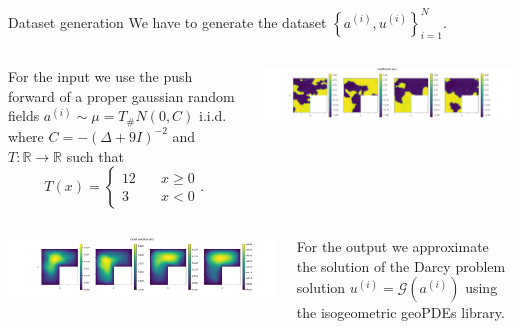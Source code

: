 \documentclass{beamer}
\newcommand{\numberset}{\mathbb}
\newcommand{\R}{\numberset{R}}
\begin{document}

\begin{frame}{Dataset generation}
	\vspace{-0.5cm}
	We have to generate the dataset $ \left\lbrace a^{(i)}, u^{(i)} \right \rbrace_{i=1}^{N} $.
	\\ \vspace{0.5cm}
	\pause
	\begin{columns}
		\begin{column}{0.7\textwidth}
			For the input we use the push forward of a proper gaussian random fields $ a^{(i)} \sim\mu = T_{\#}N(0, C) $ i.i.d. where $C = -(\Delta + 9I)^{-2}$ and $T:\R \to \R$ such that 
			\[ T(x) = \begin{cases}
				12\quad & x \ge 0\\
				3 \quad & x < 0 
			\end{cases}. \]
		\end{column}%
		\begin{column}{0.3\textwidth}
            \includegraphics[width=\textwidth]{FNO_continuation_input.png}
		\end{column}
	\end{columns}

	\vspace{0.5cm}
	\pause
	\begin{columns}
		\begin{column}{0.3\textwidth}
            \includegraphics[width=\textwidth]{FNO_continuation_output.png}
		\end{column}%
		\begin{column}{0.7\textwidth}
			For the output we approximate the solution of the Darcy problem solution $ u^{(i)} = \mathcal{G}(a^{(i)}) $ using the isogeometric geoPDEs library.
		\end{column}
	\end{columns}
\end{frame}
\end{document}
